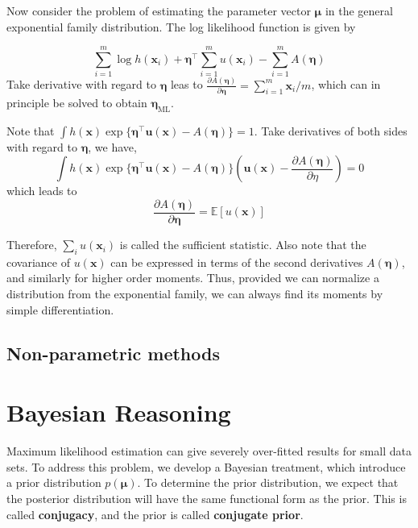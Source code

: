 \documentclass{article}
\begin{document}
\begin{itemize}
	Now consider the problem of estimating the parameter vector $\bm{\mu}$ in the general exponential family distribution. The log likelihood function is given by
	
	\begin{equation*}
	\sum_{i=1}^m \log h(\bm{x}_i) + \bm{\eta}^\top \sum_{i=1}^m u(\bm{x}_i) - \sum_{i=1}^m A(\bm{\eta})
	\end{equation*}
Take derivative with regard to $\bm{\eta}$ leas to $\frac{\partial A(\bm{\eta})}{\partial \bm{\eta}} = \sum_{i=1}^m \bm{x}_i/m$, which can in principle be solved to obtain $\bm{\eta}_\mathrm{ML}$.
	
	Note that $\int  h(\bm{x}) \exp\{ \bm{\eta}^\top \bm{u}(\bm{x}) - A(\bm{\eta}) \} = 1$. Take derivatives of both sides with regard to $\bm{\eta}$, we have,
	\begin{equation*}
	\int  h(\bm{x}) \exp\{ \bm{\eta}^\top \bm{u}(\bm{x}) - A(\bm{\eta}) \} \left(\bm{u}(\bm{x}) - \frac{\partial A(\bm{\eta})}{\partial \eta} \right) = 0
	\end{equation*}
which leads to
	\begin{equation}
	\frac{\partial A(\bm{\eta})}{\partial \bm{\eta}} = \mathbb{E} [u(\bm{x})]
	\end{equation}

	Therefore, $\sum_i u(\bm{x}_i)$ is called the sufficient statistic. Also note that the covariance of $u(\bm{x})$ can be expressed in terms of the second derivatives $A(\bm{\eta})$, and similarly for higher order moments. Thus, provided we can normalize a distribution from the exponential family, we can always find its moments by simple differentiation.
	\end{itemize}
	
	\subsection{Non-parametric methods}

\section{Bayesian Reasoning}

	Maximum likelihood estimation can give severely over-fitted results for small data sets. To address this problem, we develop a Bayesian treatment, which introduce a prior distribution $p(\bm{\mu})$. To determine the prior distribution, we expect that the posterior distribution will have the same functional form as the prior. This is called \textbf{conjugacy}, and the prior is called \textbf{conjugate prior}.
	
\end{document}
